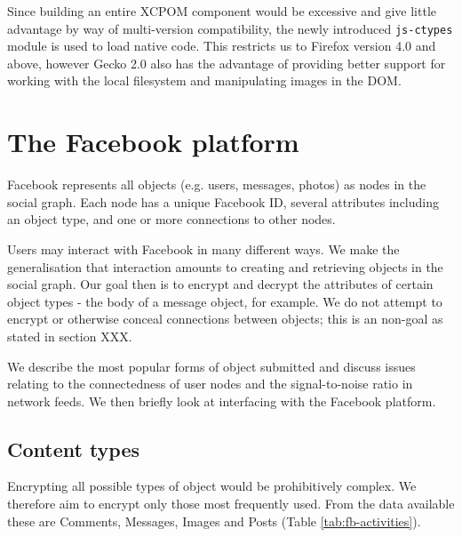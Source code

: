 Since building an entire XCPOM component would be excessive and give little advantage by way of multi-version compatibility, the newly introduced {\tt js-ctypes} module is used to load native code. This restricts us to Firefox version 4.0 and above, however Gecko 2.0 also has the advantage of providing better support for working with the local filesystem and manipulating images in the DOM.


\FloatBarrier
\section{The Facebook platform}
\label{sec:facebook}


Facebook represents all objects (e.g. users, messages, photos) as nodes in the social graph. Each node has a unique Facebook ID, several attributes including an object type, and one or more connections to other nodes.

Users may interact with Facebook in many different ways. We make the generalisation that interaction amounts to creating and retrieving objects in the social graph. Our goal then is to encrypt and decrypt the attributes of certain object types - the body of a message object, for example. We do not attempt to encrypt or otherwise conceal connections between objects; this is an non-goal as stated in section XXX.

We describe the most popular forms of object submitted and discuss issues relating to the connectedness of user nodes and the signal-to-noise ratio in network feeds. We then briefly look at interfacing with the Facebook platform.

\FloatBarrier
\subsection{Content types}

Encrypting all possible types of object would be prohibitively complex. We therefore aim to encrypt only those most frequently used. From the data available these are Comments, Messages, Images and Posts (Table \ref{tab:fb-activities}). 

